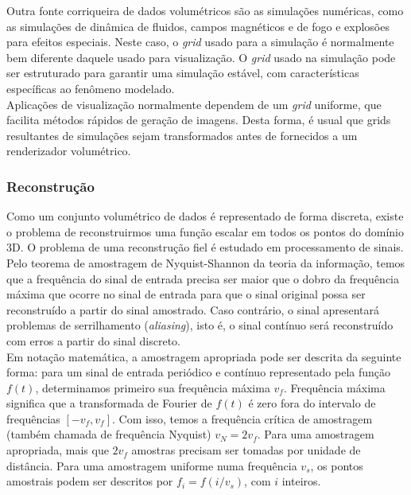 Outra fonte corriqueira de dados volumétricos são as simulações numéricas, como as simulações de dinâmica de fluidos, campos magnéticos e de fogo e explosões para efeitos especiais. Neste caso, o \emph{grid} usado para a simulação é normalmente bem diferente daquele usado para visualização. O \emph{grid} usado na simulação pode ser estruturado para garantir uma simulação estável, com características específicas ao fenômeno modelado. \\

Aplicações de visualização normalmente dependem de um \emph{grid} uniforme, que facilita métodos rápidos de geração de imagens. Desta forma, é usual que grids resultantes de simulações sejam transformados antes de fornecidos a um renderizador volumétrico. 

\subsubsection{Reconstrução}

Como um conjunto volumétrico de dados é representado de forma discreta, existe o problema de reconstruirmos uma função escalar em todos os pontos do domínio 3D.
O problema de uma reconstrução fiel é estudado em processamento de sinais. \\

Pelo teorema de amostragem de Nyquist-Shannon da teoria da informação, temos que a frequência do sinal de entrada precisa ser maior que o dobro da frequência máxima que ocorre no sinal de entrada para que o sinal original possa ser reconstruído a partir do sinal amostrado. Caso contrário, o sinal apresentará problemas de serrilhamento (\emph{aliasing}), isto é, o sinal contínuo será reconstruído com erros a partir do sinal discreto. \\

Em notação matemática, a amostragem apropriada pode ser descrita da seguinte forma: para um sinal de entrada periódico e contínuo representado pela função $f(t)$, determinamos primeiro sua frequência máxima $v_{f}$. Frequência máxima significa que a transformada de Fourier de $f(t)$ é zero fora do intervalo de frequências $[-v_{f}, v_{f}]$. Com isso, temos a frequência crítica de amostragem (também chamada de frequência Nyquist) $v_{N} = 2v_{f}$. Para uma amostragem apropriada, mais que $2v_{f}$ amostras precisam ser tomadas por unidade de distância. Para uma amostragem uniforme numa frequência $v_{s}$, os pontos amostrais podem ser descritos por $f_{i} = f(i/v_{s})$, com $i$ inteiros. \\

